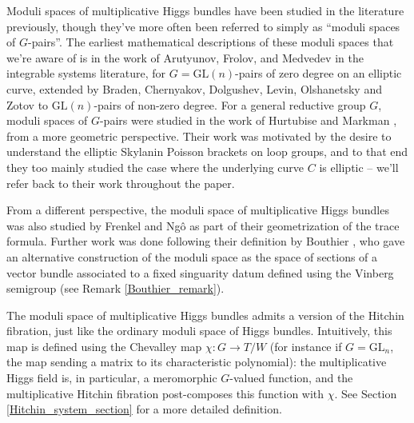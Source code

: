 \documentclass[11pt, oneside, reqno]{amsart}
\theoremstyle{definition} \newtheorem{definition}{Definition}[section]
\theoremstyle{definition} \newtheorem{remark}[definition]{Remark}
\theoremstyle{definition} \newtheorem{remarks}[definition]{Remarks}
\theoremstyle{definition} \newtheorem{question}[definition]{Question}
\theoremstyle{definition} \newtheorem*{note}{Note}
\theoremstyle{definition} \newtheorem{example}[definition]{Example}
\theoremstyle{definition} \newtheorem{examples}[definition]{Examples}
\newcommand{\GL}{\mathrm{GL}}
\begin{document}
 Moduli spaces of multiplicative Higgs bundles have been studied in
 the literature previously, though they've more often been referred to
 simply as ``moduli spaces of $G$-pairs''.  The earliest mathematical  descriptions of these moduli spaces that we're aware of is in the work of Arutyunov, Frolov, and Medvedev \cite{Arutyunov:1996vy,Arutyunov:1996uw} in the integrable systems literature, for $G = \GL(n)$-pairs of zero degree on an elliptic curve, extended by Braden, Chernyakov, Dolgushev, Levin, Olshanetsky
 and Zotov \cite{Chernyakov:2007,Braden:2003gf} to $\GL(n)$-pairs of non-zero degree.  For a general reductive group $G$, moduli spaces of $G$-pairs were studied in the work of Hurtubise and Markman \cite{HurtubiseMarkman, HurtubiseMarkman1}, from a more geometric perspective.  Their work was motivated by the desire to understand the elliptic Skylanin Poisson brackets on
 loop groups, and to that end they too mainly studied the case where the
 underlying curve $C$ is elliptic -- we'll refer back to their work
 throughout the paper.  

 From a different perspective, the moduli space of multiplicative Higgs bundles was also studied by Frenkel and Ng\^o \cite[Section 4]{FrenkelNgo} as part of their geometrization of the trace formula.  Further work was done following their definition by Bouthier \cite{Bouthier2, Bouthier1}, who gave an alternative construction of the moduli space as the space of sections of a vector bundle associated to a fixed singuarity datum defined using the Vinberg semigroup (see Remark \ref{Bouthier_remark}).  
 
 The moduli space of multiplicative Higgs bundles admits a version of the Hitchin fibration, just like the ordinary moduli space of Higgs bundles.  Intuitively, this map is defined using the Chevalley map $\chi \colon G \to T/W$ (for instance if $G = \GL_n$, the map sending a matrix to its characteristic polynomial): the multiplicative Higgs field is, in particular, a meromorphic $G$-valued function, and the multiplicative Hitchin fibration post-composes this function with $\chi$.  See Section \ref{Hitchin_system_section} for a more detailed definition.
 
\end{document}
